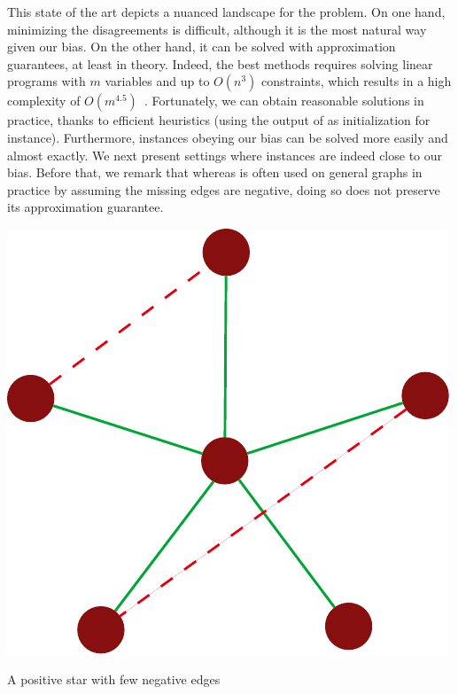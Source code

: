 This state of the art depicts a nuanced landscape for the \pcc{} problem. On one hand, minimizing
the disagreements is difficult, although it is the most natural way given our bias. On the other
hand, it can be solved with approximation guarantees, at least in theory. Indeed, the best methods
requires solving linear programs with $m$ variables and up to $O(n^3)$ constraints, which results in
a high complexity of $O(m^{4.5})$~\autocite[Section 7.2]{LPBook07}. Fortunately, we can obtain
reasonable solutions in practice, thanks to efficient heuristics (using the output of \ccpivot{} as
initialization for instance). Furthermore, instances obeying our bias can be solved more easily and
almost exactly. We next present settings where instances are indeed close to our bias.
Before that, we remark that whereas \ccpivot{} is often used on general graphs in practice by
assuming the missing edges are negative, doing so does not preserve its approximation guarantee.
\begin{marginfigure}
  \centering
  \includegraphics[width=\linewidth]{assets/raw/pivotstar.pdf}
  \caption{A positive star with few negative edges}
  \label{fig:cc_star_pivot}
\end{marginfigure}

